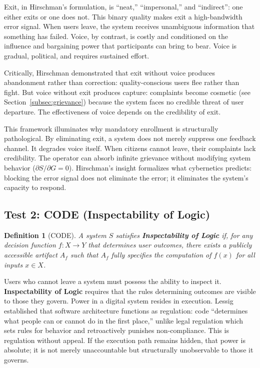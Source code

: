 \documentclass{article}
\newtheorem{definition}{Definition}
\begin{document}
Exit, in Hirschman's formulation, is ``neat,'' ``impersonal,'' and ``indirect'': one either exits or one does not. This binary quality makes exit a high-bandwidth error signal. When users leave, the system receives unambiguous information that something has failed. Voice, by contrast, is costly and conditioned on the influence and bargaining power that participants can bring to bear. Voice is gradual, political, and requires sustained effort.

Critically, Hirschman demonstrated that exit without voice produces abandonment rather than correction: quality-conscious users flee rather than fight. But voice without exit produces capture: complaints become cosmetic (see Section~\ref{subsec:grievance}) because the system faces no credible threat of user departure. The effectiveness of voice depends on the credibility of exit.

This framework illuminates why mandatory enrollment is structurally pathological. By eliminating exit, a system does not merely suppress one feedback channel. It degrades voice itself. When citizens cannot leave, their complaints lack credibility. The operator can absorb infinite grievance without modifying system behavior ($\partial S / \partial G = 0$). Hirschman's insight formalizes what cybernetics predicts: blocking the error signal does not eliminate the error; it eliminates the system's capacity to respond.

\subsection{Test 2: CODE (Inspectability of Logic)}

\begin{definition}[CODE]
\label{def:code}
A system $S$ satisfies \textbf{Inspectability of Logic} if, for any decision function $f: X \to Y$ that determines user outcomes, there exists a publicly accessible artifact $A_f$ such that $A_f$ fully specifies the computation of $f(x)$ for all inputs $x \in X$.
\end{definition}

Users who cannot leave a system must possess the ability to inspect it. \textbf{Inspectability of Logic} requires that the rules determining outcomes are visible to those they govern. Power in a digital system resides in execution. Lessig \citep{lessig2006} established that software architecture functions as regulation: code ``determines what people can or cannot do in the first place,'' unlike legal regulation which sets rules for behavior and retroactively punishes non-compliance. This is regulation without appeal. If the execution path remains hidden, that power is absolute; it is not merely unaccountable but structurally unobservable to those it governs.
\end{document}
